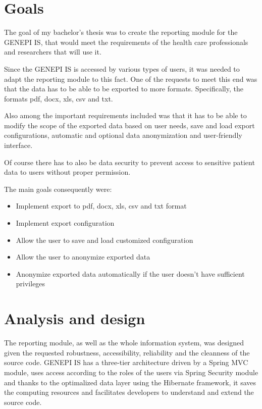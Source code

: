 \documentclass[thesis=B,english]{FITthesis}[2012/10/20]
\begin{document}
\chapter{Goals}

The goal of my bachelor's thesis was to create the reporting module for the GENEPI IS, that would meet the requirements of the health care professionals and researchers that will use it.

Since the GENEPI IS is accessed by various types of users, it was needed to adapt the reporting module to this fact. One of the requests to meet this end was that the data has to be able to be exported to more formats. Specifically, the formats pdf, docx, xls, csv and txt.

Also among the important requirements included was that it has to be able to modify the scope of the exported data based on user needs, save and load export configurations, automatic and optional data anonymization and user-friendly interface.

Of course there has to also be data security to prevent access to sensitive patient data to users without proper permission.

The main goals consequently were:
\begin{itemize}
  	\item Implement export to pdf, docx, xls, csv and txt format
  	\item Implement export configuration
  	\item Allow the user to save and load customized configuration
 	\item Allow the user to anonymize exported data 
 	\item Anonymize exported data automatically if the user doesn't have sufficient privileges
\end{itemize}

\chapter{Analysis and design}
The reporting module, as well as the whole information system, was designed given the requested robustness, accessibility, reliability and the cleanness of the source code. GENEPI IS has a three-tier architecture driven by a Spring MVC module, uses access according to the roles of the users via Spring Security module and thanks to the optimalized data layer using the Hibernate framework, it saves the computing resources and facilitates developers to understand and extend the source code.
\end{document}
